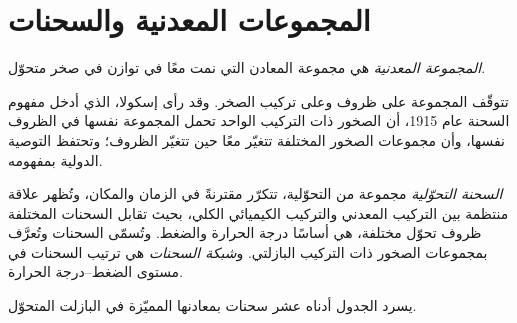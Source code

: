 \section{المجموعات المعدنية والسحنات}\label{sec:b2:metamorphic-facies:facies}

\begin{definition}\label{def:b2:metamorphic-facies:assemblage}
\emph{المجموعة المعدنية} هي مجموعة المعادن التي نمت
معًا في توازن في صخر متحوّل.
\end{definition}

تتوقّف المجموعة على ظروف  وعلى تركيب
الصخر. وقد رأى إسكولا، الذي أدخل مفهوم السحنة عام 1915، أن الصخور ذات
التركيب الواحد تحمل المجموعة نفسها في الظروف نفسها، وأن
مجموعات الصخور المختلفة تتغيّر معًا حين تتغيّر الظروف؛ وتحتفظ
التوصية الدولية بمفهومه.

\begin{definition}\label{def:b2:metamorphic-facies:facies}
\emph{السحنة التحوّلية} مجموعة من 
التحوّلية، تتكرّر مقترنةً في الزمان والمكان، وتُظهر علاقة منتظمة
بين التركيب المعدني والتركيب الكيميائي الكلي، بحيث تقابل السحنات المختلفة
ظروف تحوّل مختلفة، هي أساسًا درجة الحرارة والضغط.
وتُسمّى السحنات وتُعرَّف بمجموعات الصخور ذات التركيب البازلتي.
و\emph{شبكة السحنات} هي ترتيب السحنات في
مستوى الضغط--درجة الحرارة.
\end{definition}

يسرد الجدول أدناه عشر سحنات بمعادنها المميّزة في البازلت المتحوّل.


